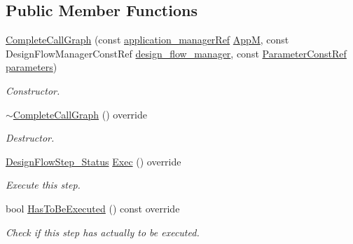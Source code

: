 \subsection*{Public Member Functions}
\begin{DoxyCompactItemize}
\item 
\hyperlink{classCompleteCallGraph_a6ddf209c4b687c7a494a60f4f9e54b3d}{Complete\+Call\+Graph} (const \hyperlink{application__manager_8hpp_a04ccad4e5ee401e8934306672082c180}{application\+\_\+manager\+Ref} \hyperlink{classFrontendFlowStep_a0ac0d8db2a378416583f51c4faa59d15}{AppM}, const Design\+Flow\+Manager\+Const\+Ref \hyperlink{classDesignFlowStep_ab770677ddf087613add30024e16a5554}{design\+\_\+flow\+\_\+manager}, const \hyperlink{Parameter_8hpp_a37841774a6fcb479b597fdf8955eb4ea}{Parameter\+Const\+Ref} \hyperlink{classDesignFlowStep_a802eaafe8013df706370679d1a436949}{parameters})
\begin{DoxyCompactList}\small\item\em Constructor. \end{DoxyCompactList}\item 
\hyperlink{classCompleteCallGraph_a48c3b935dcb84869759b7ee9c3e293bb}{$\sim$\+Complete\+Call\+Graph} () override
\begin{DoxyCompactList}\small\item\em Destructor. \end{DoxyCompactList}\item 
\hyperlink{design__flow__step_8hpp_afb1f0d73069c26076b8d31dbc8ebecdf}{Design\+Flow\+Step\+\_\+\+Status} \hyperlink{classCompleteCallGraph_adfe7bbc7b2950105a2fd26b29436964e}{Exec} () override
\begin{DoxyCompactList}\small\item\em Execute this step. \end{DoxyCompactList}\item 
bool \hyperlink{classCompleteCallGraph_a8380495bcddb634f538066b11d927d70}{Has\+To\+Be\+Executed} () const override
\begin{DoxyCompactList}\small\item\em Check if this step has actually to be executed. \end{DoxyCompactList}\end{DoxyCompactItemize}
